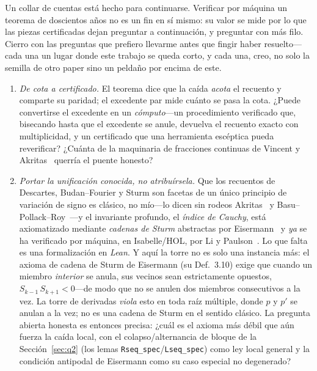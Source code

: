 \documentclass[11pt]{article}
\newcommand{\lean}[1]{\texttt{#1}}
\begin{document}
Un collar de cuentas est\'a hecho para continuarse. Verificar por m\'aquina un teorema de doscientos
a\~nos no es un fin en s\'i mismo: su valor se mide por lo que las piezas certificadas dejan preguntar a
continuaci\'on, y preguntar con m\'as filo. Cierro con las preguntas que prefiero llevarme antes que
fingir haber resuelto---cada una un lugar donde este trabajo se queda corto, y cada una, creo, no solo
la semilla de otro paper sino un pelda\~no por encima de este.

\begin{enumerate}\itemsep3pt
\item \emph{De cota a certificado.} El teorema dice que la ca\'ida \emph{acota} el recuento y comparte
su paridad; el excedente par mide cu\'anto se pasa la cota. ¿Puede convertirse el excedente en un
\emph{c\'omputo}---un procedimiento verificado que, bisecando hasta que el excedente se anule, devuelva
el recuento exacto con multiplicidad, y un certificado que una herramienta esc\'eptica pueda
reverificar? ¿Cu\'anta de la maquinaria de fracciones continuas de Vincent y
Akritas~\cite{vincent,collinsakritas} querr\'ia el puente honesto?

\item \emph{Portar la unificaci\'on conocida, no atribu\'irsela.} Que los recuentos de Descartes,
Budan--Fourier y Sturm son facetas de un \'unico principio de variaci\'on de signo es cl\'asico, no
m\'io---lo dicen sin rodeos Akritas~\cite{akritas} y Basu--Pollack--Roy~\cite{bpr}---y el invariante
profundo, el \emph{\'indice de Cauchy}, est\'a axiomatizado mediante \emph{cadenas de Sturm} abstractas
por Eisermann~\cite{eisermann} y \emph{ya} se ha verificado por m\'aquina, en Isabelle/HOL, por Li y
Paulson~\cite{liCauchy}. Lo que falta es una formalizaci\'on en \emph{Lean}. Y aqu\'i la torre no es solo
una instancia m\'as: el axioma de cadena de Sturm de Eisermann (su Def.~3.10) exige que cuando un
miembro \emph{interior} se anula, sus vecinos sean estrictamente opuestos, $S_{k-1}\,S_{k+1}<0$---de modo
que no se anulen dos miembros consecutivos a la vez. La torre de derivadas \emph{viola} esto en toda
ra\'iz m\'ultiple, donde $p$ y $p'$ se anulan a la vez; no es una cadena de Sturm en el sentido
cl\'asico. La pregunta abierta honesta es entonces precisa: ¿cu\'al es el axioma m\'as d\'ebil que a\'un
fuerza la ca\'ida local, con el colapso/alternancia de bloque de la Secci\'on~\ref{sec:q2} (los lemas
\lean{Rseq\_spec}/\lean{Lseq\_spec}) como ley local general y la condici\'on antipodal de Eisermann como
su caso especial no degenerado?


\end{enumerate}
\end{document}
